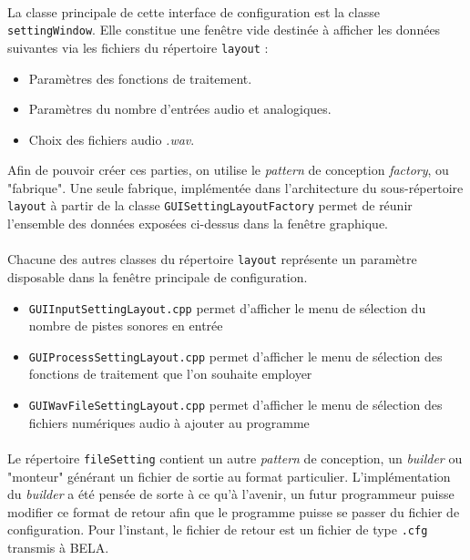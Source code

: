  \paragraph{}
 La classe principale de cette interface de configuration est la
 classe \verb!settingWindow!. Elle constitue une fenêtre vide destinée
 à afficher les données suivantes via les fichiers du répertoire
 \verb!layout! :
 \begin{itemize}
  \item Paramètres des fonctions de traitement.
  \item Paramètres du nombre d'entrées audio et analogiques.
  \item Choix des fichiers audio \textit{.wav}.
 \end{itemize}
 Afin de pouvoir créer ces parties, on utilise le \textit{pattern} de
 conception \textit{factory}, ou "fabrique". Une seule fabrique,
 implémentée dans l'architecture du sous-répertoire \verb!layout! à
 partir de la classe \verb!GUISettingLayoutFactory! permet de réunir
 l'ensemble des données exposées ci-dessus dans la fenêtre graphique.
 \paragraph{}
 Chacune des autres classes du répertoire \verb!layout! représente un
 paramètre disposable dans la fenêtre principale de configuration.
 \begin{itemize}
 \item \verb!GUIInputSettingLayout.cpp! permet d'afficher le menu de sélection du nombre de pistes sonores en entrée
 \item \verb!GUIProcessSettingLayout.cpp! permet d'afficher le menu de sélection des fonctions de traitement que l'on souhaite employer
   \item \verb!GUIWavFileSettingLayout.cpp! permet d'afficher le menu de sélection des fichiers numériques audio à ajouter au programme
 \end{itemize}
 \paragraph{}
 Le répertoire \verb!fileSetting! contient un autre \textit{pattern} de conception, un \textit{builder} ou "monteur" générant un fichier de sortie au format particulier. L'implémentation du \textit{builder} a été pensée de sorte à ce qu'à l'avenir, un futur programmeur puisse modifier ce format de retour afin que le programme puisse se passer du fichier de configuration. Pour l'instant, le fichier de retour est un fichier de type \verb!.cfg! transmis à BELA.

